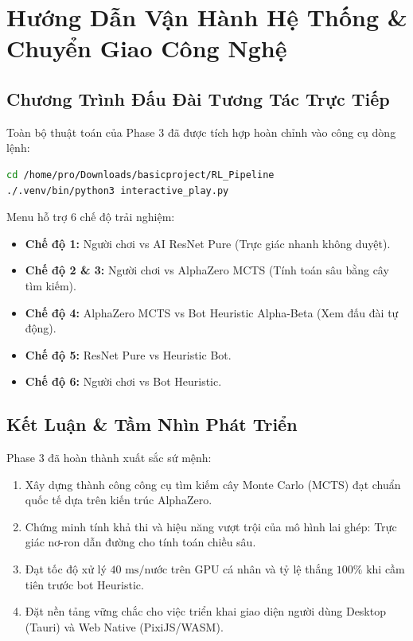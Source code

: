 \documentclass[12pt,a4paper,oneside]{report}
\begin{document}
\chapter{Hướng Dẫn Vận Hành Hệ Thống \& Chuyển Giao Công Nghệ}

\section{Chương Trình Đấu Đài Tương Tác Trực Tiếp}

Toàn bộ thuật toán của Phase 3 đã được tích hợp hoàn chỉnh vào công cụ dòng lệnh:
\begin{lstlisting}[language=bash]
cd /home/pro/Downloads/basicproject/RL_Pipeline
./.venv/bin/python3 interactive_play.py
\end{lstlisting}

Menu hỗ trợ 6 chế độ trải nghiệm:
\begin{itemize}
    \item \textbf{Chế độ 1:} Người chơi vs AI ResNet Pure (Trực giác nhanh không duyệt).
    \item \textbf{Chế độ 2 \& 3:} Người chơi vs AlphaZero MCTS (Tính toán sâu bằng cây tìm kiếm).
    \item \textbf{Chế độ 4:} AlphaZero MCTS vs Bot Heuristic Alpha-Beta (Xem đấu đài tự động).
    \item \textbf{Chế độ 5:} ResNet Pure vs Heuristic Bot.
    \item \textbf{Chế độ 6:} Người chơi vs Bot Heuristic.
\end{itemize}

\section{Kết Luận \& Tầm Nhìn Phát Triển}

Phase 3 đã hoàn thành xuất sắc sứ mệnh:
\begin{enumerate}
    \item Xây dựng thành công công cụ tìm kiếm cây Monte Carlo (MCTS) đạt chuẩn quốc tế dựa trên kiến trúc AlphaZero.
    \item Chứng minh tính khả thi và hiệu năng vượt trội của mô hình lai ghép: Trực giác nơ-ron dẫn đường cho tính toán chiều sâu.
    \item Đạt tốc độ xử lý $40\text{ ms/nước}$ trên GPU cá nhân và tỷ lệ thắng $100\%$ khi cầm tiên trước bot Heuristic.
    \item Đặt nền tảng vững chắc cho việc triển khai giao diện người dùng Desktop (Tauri) và Web Native (PixiJS/WASM).
\end{enumerate}
\end{document}
